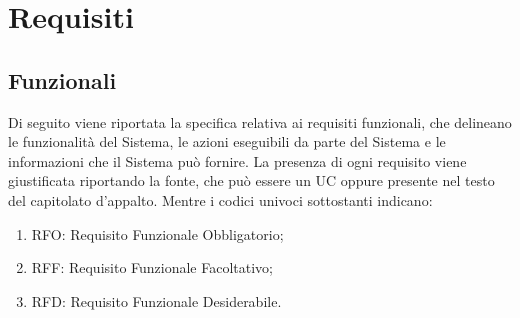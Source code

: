 \section{Requisiti}

\subsection{Funzionali}

Di seguito viene riportata la specifica relativa ai requisiti funzionali, che delineano le funzionalità del Sistema, le azioni eseguibili
da parte del Sistema e le informazioni che il Sistema può fornire. La presenza di ogni requisito viene giustificata riportando la fonte, che può essere un UC oppure presente
nel testo del capitolato d'appalto. Mentre i codici univoci sottostanti indicano:
\begin{enumerate}
	\item RFO: Requisito Funzionale Obbligatorio;
	\item RFF: Requisito Funzionale Facoltativo;
	\item RFD: Requisito Funzionale Desiderabile.
\end{enumerate}


